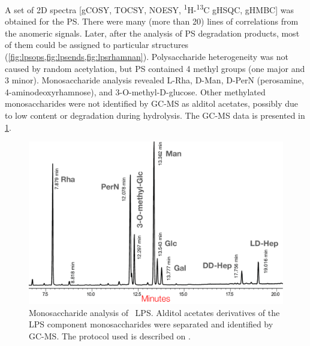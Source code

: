 		A set of 2D spectra [\ac{gCOSY}, \ac{TOCSY}, \ac{NOESY}, \textsuperscript{1}H-\textsuperscript{13}C \ac{gHSQC}, \ac{gHMBC}] was obtained for the \ac{PS}. There were many (more than 20) lines of correlations from the anomeric signals. Later, after the analysis of \ac{PS} degradation products, most of them could be assigned to particular structures (\cref{fig:lpsops,fig:lpsends,fig:lpsrhamnan}). Polysaccharide heterogeneity was not caused by random acetylation, but \ac{PS} contained 4 methyl groups (one major and 3 minor). Monosaccharide analysis revealed L-Rha, D-Man, D-PerN (perosamine, 4-aminodeoxyrhamnose), and 3-O-methyl-D-glucose. Other methylated monosaccharides were not identified by \ac{GC-MS} as alditol acetates, possibly due to low content or degradation during hydrolysis. The \ac{GC-MS} data is presented in \cref{fig:monosaccharide_analysis}.

		\begin{figure}[htb]  %
			\begin{center}
				\includegraphics[width=\textwidth]{lps_chapter/img/lps_monosaccharides.pdf}
			\end{center}
			\caption[Monosaccharide analysis of \ac{LPS}]{Monosaccharide analysis of \caulobacter\ \ac{LPS}. Alditol acetates derivatives of the \ac{LPS} component monosaccharides were separated and identified by \ac{GC-MS}. The protocol used is described on .}
			\label{fig:monosaccharide_analysis}
		\end{figure}


